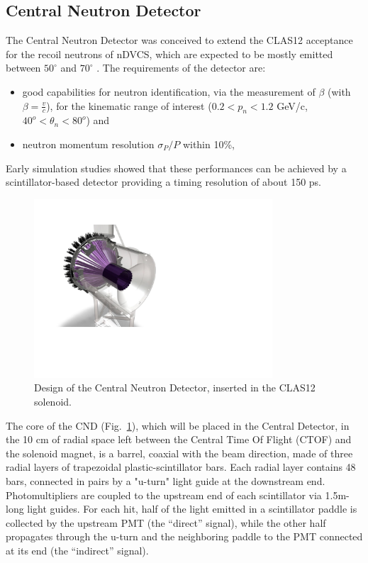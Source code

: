 \subsection{Central Neutron Detector}\label{cnd-section}
The Central Neutron Detector was conceived to extend the CLAS12 acceptance for the recoil neutrons of nDVCS, which are expected to be mostly emitted between $50^{\circ}$ and $70^{\circ}$ \cite{proposal}. The requirements of the detector are:
\begin{itemize}
\item{good capabilities for neutron identification, via the measurement of $\beta$ (with $\beta=\frac{v}{c}$), for the kinematic range of interest ($0.2<p_n<1.2$ GeV/c, $40^o<\theta_n<80^o$)} and
\item{neutron momentum resolution $\sigma_P/P$ within 10\%,}
\end{itemize}
Early simulation studies \cite{proposal} showed that these performances can be achieved by a scintillator-based detector providing a timing resolution of about 150 ps. 

\begin{figure}[ht]
\begin{center}
\includegraphics[width=3.5in]{CND_bello.pdf}
\end{center}
\caption [Design of the Central Neutron Detector]
{Design of the Central Neutron Detector, inserted in the CLAS12 solenoid.}
\label{cnd_nice}
\end{figure}

The core of the CND (Fig.~\ref{cnd_nice}), which will be placed in the Central Detector, in the 10 cm of radial space left between the Central Time Of Flight (CTOF) and the solenoid magnet, is a barrel, coaxial with the beam direction, made of three radial layers of trapezoidal plastic-scintillator bars. 
Each radial layer contains 48 bars, connected in pairs by a "u-turn" light guide at the downstream end.
Photomultipliers are coupled to the upstream end of each scintillator via 1.5m-long light guides. For each hit, half of the light emitted in a scintillator paddle is collected by the upstream PMT (the ``direct'' signal), while the other half propagates through the u-turn and the neighboring paddle to the PMT connected at its end (the ``indirect'' signal). 

